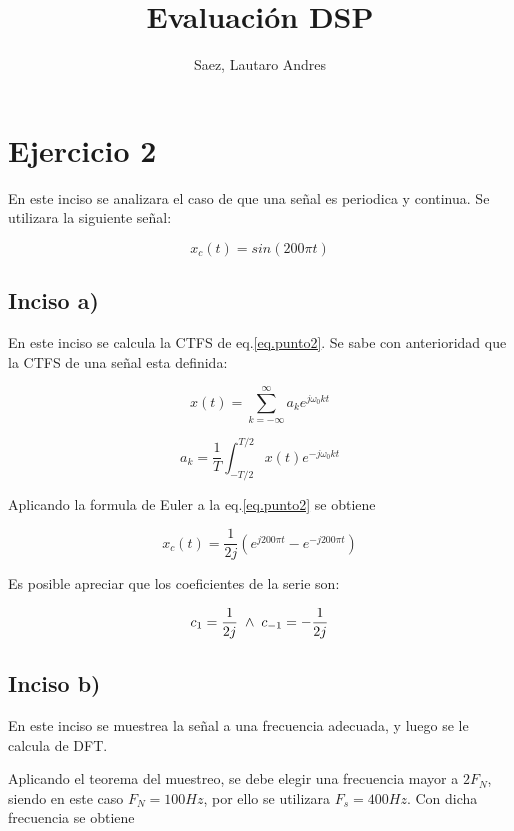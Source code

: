 \documentclass[letterpaper]{article}
\title{Evaluación DSP}
\author{Saez, Lautaro Andres}
\begin{document}
    \section{Ejercicio 2}

    En este inciso se analizara el caso de que una señal es periodica y continua. Se utilizara la siguiente señal: 

    \begin{equation}
        \label{eq.punto2}
        x_c(t) = sin( 200 \pi t )
    \end{equation}

    \subsection*{Inciso a)}

    En este inciso se calcula la CTFS de eq.\ref{eq.punto2}. Se sabe con anterioridad que la CTFS de una señal
    esta definida:
    
    \begin{equation}
        x(t)= \sum_{k=-\infty}^{\infty} a_k e^{j\omega_0 kt}
    \end{equation}

    \begin{equation}
        a_k = \frac{1}{T} \int_{-T/2}^{T/2} x(t)e^{-j\omega_0 kt}
    \end{equation}

    Aplicando la formula de Euler a la eq.\ref{eq.punto2} se obtiene 

    \begin{equation}
        x_c(t)=\frac{1}{2j}( e^{j200\pi t} - e^{-j200 \pi t})
    \end{equation}

    Es posible apreciar que los coeficientes de la serie son: 

    \begin{equation}
        c_1 = \frac{1}{2j} \hspace*{.1cm} \land \hspace*{.1cm} c_{-1}=-\frac{1}{2j}
    \end{equation}

    \subsection*{Inciso b)}

    En este inciso se muestrea la señal a una frecuencia adecuada, y luego se le calcula de DFT.

    Aplicando el teorema del muestreo, se debe elegir una frecuencia mayor a $2F_N$, siendo 
    en este caso $F_N=100Hz$, por ello se utilizara $F_s=400Hz$. Con dicha frecuencia se obtiene 
\end{document}
